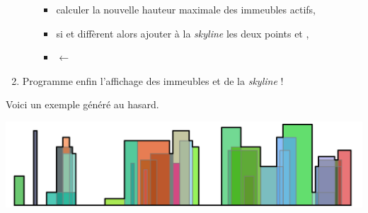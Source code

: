 \documentclass[11pt,class=report,crop=false]{standalone}
\begin{document}
\begin{activite}[Skyline]
\begin{enumerate}
\begin{itemize}
\begin{itemize}
			\item  calculer la nouvelle hauteur maximale  des immeubles actifs,
			
			\item si  et  diffèrent alors ajouter à la \emph{skyline} les deux points  et ,
		
			\item {} $\leftarrow$ 
		\end{itemize}
	\end{itemize}
	
	
	\item Programme enfin l'affichage des immeubles et de la \emph{skyline} !
\end{enumerate}


Voici un exemple généré au hasard. 
\begin{center}
	
	\includegraphics[scale=\myscale,scale=0.4]{ecran-skyline-8}
\end{center}
\end{activite}
\end{document}
